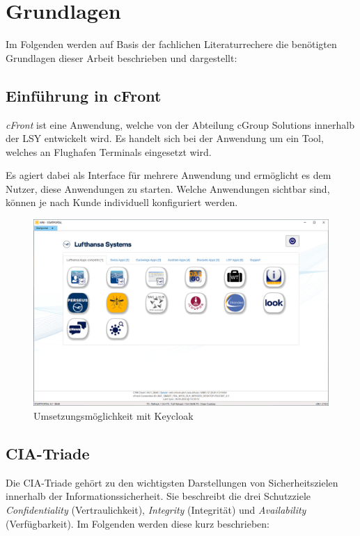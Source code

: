 \chapter{Grundlagen}
Im Folgenden werden auf Basis der fachlichen Literaturrechere die benötigten Grundlagen dieser Arbeit beschrieben und dargestellt:

\section{Einführung in cFront}
\textit{cFront} ist eine Anwendung, welche von der Abteilung cGroup Solutions innerhalb der \ac{LSY} entwickelt wird. Es handelt sich bei der Anwendung um ein Tool, welches an Flughafen Terminals eingesetzt wird. 

Es agiert dabei als Interface für mehrere Anwendung und ermöglicht es dem Nutzer, diese Anwendungen zu starten. Welche Anwendungen sichtbar sind, können je nach Kunde individuell konfiguriert werden. 
\begin{figure}[h]
	\centering 
	\includegraphics[width=1\textwidth]{img/abbildungen/MicrosoftTeams-image (3).png}
	\captionsetup{format=hang}
	\caption{Umsetzungsmöglichkeit mit Keycloak}
\end{figure}

\section{CIA-Triade}

Die CIA-Triade gehört zu den wichtigsten Darstellungen von Sicherheitszielen innerhalb der Informationssicherheit. Sie beschreibt die drei Schutzziele \textit{Confidentiality} (Vertraulichkeit), \textit{Integrity} (Integrität) und \textit{Availability} (Verfügbarkeit). Im Folgenden werden diese kurz beschrieben:

